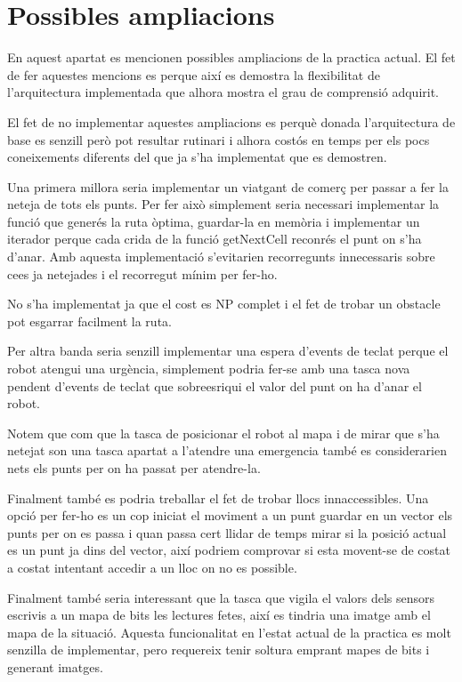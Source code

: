 \section{Possibles ampliacions}

En aquest apartat es mencionen possibles ampliacions de la practica actual. El fet de fer aquestes mencions
es perque així es demostra la flexibilitat de l'arquitectura implementada que alhora mostra el grau
de comprensió adquirit.

El fet de no implementar aquestes ampliacions es perquè donada l'arquitectura de base es senzill però pot resultar
rutinari i alhora costós en temps per els pocs coneixements diferents del que ja s'ha implementat que es demostren.

Una primera millora seria implementar un viatgant de comerç per passar a fer la neteja de tots els punts.
Per fer això simplement seria necessari implementar la funció que generés la ruta òptima, guardar-la en 
memòria i implementar un iterador perque cada crida de la funció getNextCell reconrés el punt on s'ha d'anar.
Amb aquesta implementació s'evitarien recorregunts innecessaris sobre ce\lgem es ja netejades i el recorregut
mínim per fer-ho.

No s'ha implementat ja que el cost es NP complet i el fet de trobar un obstacle pot esgarrar facilment la ruta.

Per altra banda seria senzill implementar una espera d'events de teclat perque el robot atengui una urgència,
simplement podria fer-se amb una tasca nova pendent d'events de teclat que sobreesriqui el valor del  punt
on ha d'anar el robot.

Notem que com que la tasca de posicionar el robot al mapa i de mirar que s'ha netejat son una tasca apartat
a l'atendre una emergencia també es considerarien nets els punts per on ha passat per atendre-la.

Finalment també es podria treballar el fet de trobar llocs innaccessibles. Una opció per fer-ho
es un cop iniciat el moviment a un punt guardar en un vector els punts per on es passa i quan passa
cert llidar de temps mirar si la posició actual es un punt ja dins del vector, així podriem comprovar
si esta movent-se de costat a costat intentant accedir a un lloc on no es possible.

Finalment també seria interessant que la tasca que vigila el valors dels sensors escrivis a un mapa de bits
les lectures fetes, així es tindria una imatge amb el mapa de la situació. Aquesta funcionalitat 
en l'estat actual de la practica es molt senzilla de implementar, pero requereix tenir soltura emprant
mapes de bits i generant imatges.